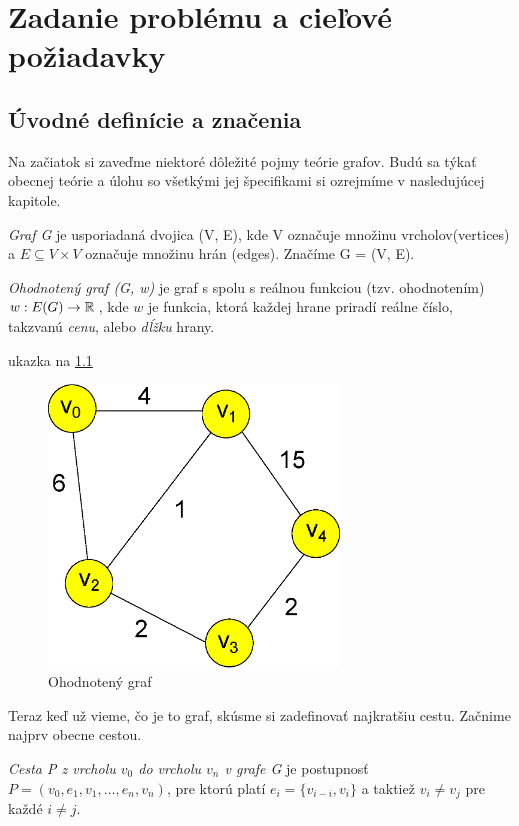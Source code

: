 \chapter{Zadanie problému a cieľové požiadavky}

\section{Úvodné definície a značenia}
Na začiatok si zaveďme niektoré dôležité pojmy teórie grafov.
Budú sa týkať obecnej teórie a úlohu so všetkými jej špecifikami si ozrejmíme v nasledujúcej kapitole.
\begin{define}
{\sl Graf G} je usporiadaná dvojica (V, E), kde V označuje množinu vrcholov(vertices) a $E \subseteq V \times V $ označuje množinu hrán (edges). Značíme G = (V, E).
\end{define}

\begin{define}
{\sl Ohodnotený graf (G, w)} je graf s spolu s reálnou funkciou (tzv. ohodnotením)
$w: E(G) \to \mathbb{R}\,$, kde $w$ je funkcia, ktorá každej hrane priradí
reálne číslo, takzvanú \emph{cenu}, alebo \emph{dĺžku} hrany.
\end{define}
ukazka na \ref{fig:ohodnoteny_graf}

\begin{figure}[h]
\includegraphics[height=7.5cm]{./img/graf.eps}
\caption{Ohodnotený graf}
\label{fig:ohodnoteny_graf}
\end{figure}

Teraz keď už vieme, čo je to graf, skúsme si zadefinovať najkratšiu cestu. Začnime najprv obecne cestou.

\begin{define}
{\sl Cesta P z vrcholu $v_0$ do vrcholu $v_n$ v grafe G } je postupnosť $P = (v_{0},e_{1},v_{1},\dots, e_{n}, v_{n})$,
pre ktorú platí $e_{i} = \{v_{i-i},v_{i}\}$ a taktiež
$v_{i} \ne v_{j}$ pre každé $i \ne j$.
\end{define}




